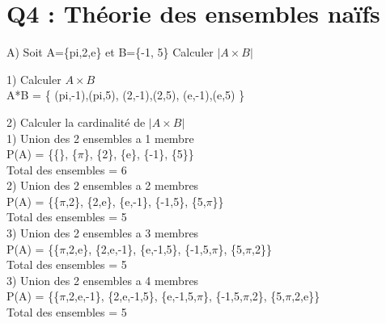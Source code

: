 \section{Q4 : Théorie des ensembles naïfs}

\vspace{4mm} %

A) Soit A=\{pi,2,e\} et B=\{-1, 5\} Calculer ${|A\times B|}$ \\

\vspace{4mm} %

1) Calculer ${A\times B}$ \\

A*B = \{ (pi,-1),(pi,5), (2,-1),(2,5), (e,-1),(e,5) \}

\vspace{8mm} %

2) Calculer la cardinalité de ${|A\times B|}$ \\

1) Union des 2 ensembles a 1 membre \\

P(A) = \{\{\}, \{$\pi$\}, \{2\}, \{e\}, \{-1\}, \{5\}\} \\

Total des ensembles = 6 \\

2) Union des 2 ensembles a 2 membres \\

P(A) = \{\{$\pi$,2\}, \{2,e\}, \{e,-1\}, \{-1,5\}, \{5,$\pi$\}\} \\

Total des ensembles = 5 \\

3) Union des 2 ensembles a 3 membres \\

P(A) = \{\{$\pi$,2,e\}, \{2,e,-1\}, \{e,-1,5\}, \{-1,5,$\pi$\}, \{5,$\pi$,2\}\} \\

Total des ensembles = 5 \\

3) Union des 2 ensembles a 4 membres \\

P(A) = \{\{$\pi$,2,e,-1\}, \{2,e,-1,5\}, \{e,-1,5,$\pi$\}, \{-1,5,$\pi$,2\}, \{5,$\pi$,2,e\}\} \\

Total des ensembles = 5 \\

